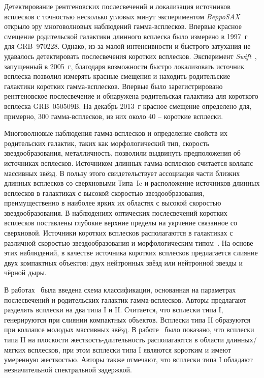 Детектирование рентгеновских послесвечений и локализация источников всплесков с точностью несколько угловых минут экспериментом \textit{BeppoSAX}~\citep{Boella1997} открыло эру многоволновых наблюдений гамма-всплесков. Впервые красное смещение родительской галактики длинного всплеска было измерено в 1997~г для GRB~970228. Однако, из-за малой интенсивности и быстрого затухания не удавалось детектировать послесвечения коротких всплесков. Эксперимент \textit{Swift}~\citep{Gehrels_2004}, запущенный в 2005~г, благодаря возможности быстро локализовать источник всплеска позволил измерять красные смещения и находить родительские галактики коротких гамма-всплесков. Впервые было зарегистрировано рентгеновское послесвечение и обнаружена родительская галактика для короткого всплеска GRB~050509B. На декабрь 2013~г красное смещение определено для, примерно, 300 гамма-всплесков, из них около 40 -- короткие всплески.

Многоволновые наблюдения гамма-всплесков и определение свойств их родительских галактик, таких как морфологический тип, скорость звездообразования, металличность, позволили выдвинуть предположения об источниках всплесков. Источником длинных гамма-всплесков считается коллапс массивных звёзд. В пользу этого свидетельствует ассоциация части близких длинных всплесков со сверхновыми Типа~Ic и расположение источников длинных всплесков в галактиках с высокой скоростью звездообразования, преимущественно в наиболее ярких их областях с высокой скоростью звездообразования. В наблюдениях оптических послесвечений коротких всплесков поставлены глубокие верхние пределы на уярчение связанное со сверхновой. Источники коротких всплесков располагаются в галактиках с различной скоростью звездообразования и морфологическим типом~\citep[см. обзор][]{Berger_2014}. На основе этих наблюдений, в качестве источника коротких всплесков предлагается слияние двух компактных объектов: двух нейтронных звёзд или нейтронной звезды и чёрной дыры.

В работах~\citep{Zhang_2006, Zhang_2007, Zhang_2009} была введена схема классификации, основанная на параметрах послесвечений и родительских галактик гамма-всплесков. Авторы предлагают разделять всплески на два типа I и II. Считается, что всплески типа I, генерируются при слиянии компактных объектов. Всплески типа II образуются при коллапсе молодых массивных звёзд. В работе~\citep{Zhang_2009} было показано, что всплески типа II на плоскости жесткость-длительность располагаются в области длинных/мягких всплесков, при этом всплески типа I являются коротким и имеют умеренную жесткостью. Авторы также отмечают, что всплески типа I обладают незначительной спектральной задержкой.

